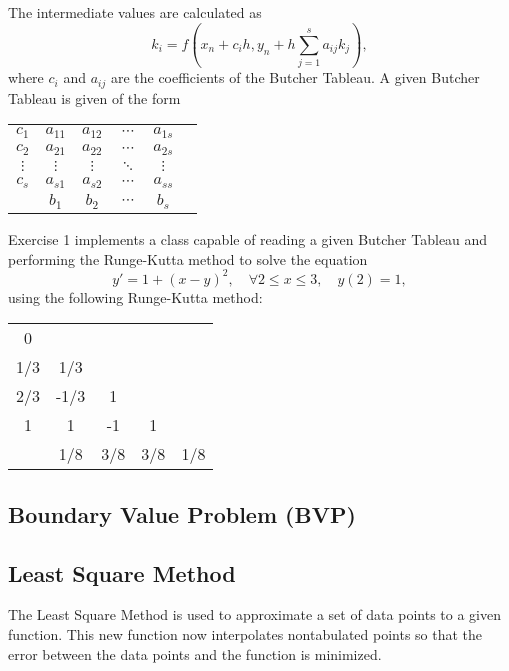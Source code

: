 The intermediate values are calculated as
\begin{equation}
    k_i = f(x_n + c_ih, y_n + h\sum_{j=1}^{s}a_{ij}k_j),
\end{equation}
where $c_i$ and $a_{ij}$ are the coefficients of the Butcher Tableau. A given Butcher Tableau is given of the form 
\begin{table}[H]
    \centering
    \begin{tabular}{c|ccccc}
        $c_1$ & $a_{11}$ & $a_{12}$ & $\cdots$ & $a_{1s}$ \\
        $c_2$ & $a_{21}$ & $a_{22}$ & $\cdots$ & $a_{2s}$ \\
        $\vdots$ & $\vdots$ & $\vdots$ & $\ddots$ & $\vdots$ \\
        $c_s$ & $a_{s1}$ & $a_{s2}$ & $\cdots$ & $a_{ss}$ \\
        \hline
        & $b_1$ & $b_2$ & $\cdots$ & $b_s$
    \end{tabular}
\end{table}

Exercise 1 implements a class capable of reading a given Butcher Tableau and performing the Runge-Kutta method to solve the equation
\begin{equation}
    y' = 1 + (x-y)^2, \quad \forall 2 \leq x \leq 3, \quad y(2) = 1,
\end{equation}
using the following Runge-Kutta method:
\begin{table}[H]
    \centering
    \begin{tabular}{c|cccc}
        0   \\
        1/3 & 1/3  \\
        2/3 & -1/3 & 1  \\
        1 & 1 & -1 & 1  \\
        \hline
        & 1/8 & 3/8 & 3/8 & 1/8
    \end{tabular}
\end{table}

\subsection{Boundary Value Problem (BVP)}\label{subsec:bvp}

\subsection{Least Square Method}\label{subsec:least_squares_method}
The Least Square Method is used to approximate a set of data points to a given function. This new function now interpolates nontabulated points so that the error between the data points and the function is minimized. 


